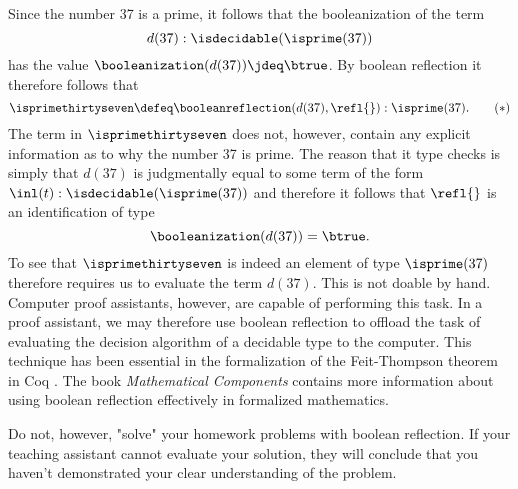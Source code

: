 \begin{rmk}
  Since the number 37 is a prime, it follows that the booleanization of the term
  \begin{equation*}
    d(37):\isdecidable(\isprime(37))
  \end{equation*}
  has the value $\booleanization(d(37))\jdeq\btrue$. By boolean reflection it therefore follows that
  \begin{equation}\label{eq:is-prime-37}
    \isprimethirtyseven\defeq \booleanreflection(d(37),\refl{}):\isprime(37).\tag{\textasteriskcentered}
  \end{equation}
  The term in $\isprimethirtyseven$ does not, however, contain any explicit information as to why the number 37 is prime. The reason that it type checks is simply that $d(37)$ is judgmentally equal to some term of the form $\inl(t):\isdecidable(\isprime(37))$ and therefore it follows that $\refl{}$ is an identification of type
  \begin{equation*}
    \booleanization(d(37))=\btrue.
  \end{equation*}
  To see that $\isprimethirtyseven$ is indeed an element of type $\isprime(37)$ therefore requires us to evaluate the term $d(37)$. This is not doable by hand. Computer proof assistants, however, are capable of performing this task. In a proof assistant, we may therefore use boolean reflection to offload the task of evaluating the decision algorithm of a decidable type to the computer. This technique has been essential in the formalization of the Feit-Thompson theorem in Coq \cite{Gonthier}. The book \emph{Mathematical Components} \cite{mathematical-components} contains more information about using boolean reflection effectively in formalized mathematics.

  Do not, however, "solve" your homework problems with boolean reflection. If your teaching assistant cannot evaluate your solution, they will conclude that you haven't demonstrated your clear understanding of the problem.
\end{rmk}

